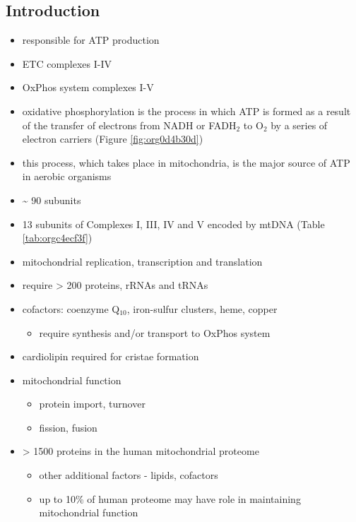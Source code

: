 \documentclass{scrartcl}
\begin{document}
\subsection{Introduction}
\label{sec:orgb4c54e3}
\begin{itemize}
\item responsible for ATP production
\item ETC complexes I-IV
\item OxPhos system complexes I-V
\item oxidative phosphorylation is the process in which ATP is formed as a
result of the transfer of electrons from NADH or FADH\(_{\text{2}}\) to O\(_{\text{2}}\) by a
series of electron carriers (Figure \ref{fig:org0d4b30d})
\item this process, which takes place in mitochondria, is the major source
of ATP in aerobic organisms

\item \textasciitilde{} 90 subunits
\item 13 subunits of Complexes I, III, IV and V encoded by mtDNA (Table \ref{tab:orgc4ecf3f})
\item mitochondrial replication, transcription and translation
\item require \textgreater{} 200 proteins, rRNAs and tRNAs
\item cofactors: coenzyme Q\(_{\text{10}}\), iron-sulfur clusters, heme, copper
\begin{itemize}
\item require synthesis and/or transport to OxPhos system
\end{itemize}
\item cardiolipin required for cristae formation
\item mitochondrial function
\begin{itemize}
\item protein import, turnover
\item fission, fusion
\end{itemize}
\item \textgreater{} 1500 proteins in the human mitochondrial proteome
\begin{itemize}
\item other additional factors - lipids, cofactors
\item up to 10\% of human proteome may have role in maintaining mitochondrial function
\end{itemize}
\end{itemize}
\end{document}
